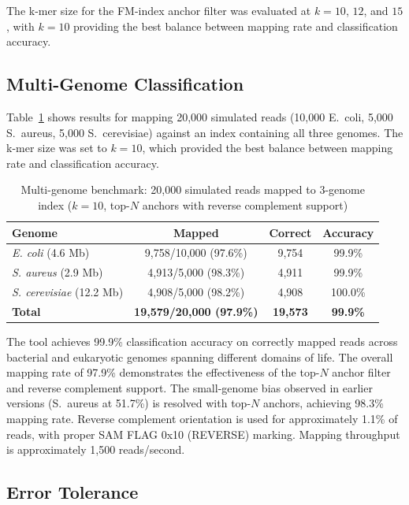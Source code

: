 \documentclass[10pt]{article}
\begin{document}
The k-mer size for the FM-index anchor filter was evaluated at $k = 10$, $12$, and $15$, with $k=10$ providing the best balance between mapping rate and classification accuracy.

\subsection{Multi-Genome Classification}

Table~\ref{tab:multigenome} shows results for mapping 20,000 simulated reads (10,000 E.~coli, 5,000 S.~aureus, 5,000 S.~cerevisiae) against an index containing all three genomes. The k-mer size was set to $k=10$, which provided the best balance between mapping rate and classification accuracy.

\begin{table}[htbp]
\centering
\caption{Multi-genome benchmark: 20,000 simulated reads mapped to 3-genome index ($k=10$, top-$N$ anchors with reverse complement support)}
\label{tab:multigenome}
\begin{tabular}{lccc}
\toprule
\textbf{Genome} & \textbf{Mapped} & \textbf{Correct} & \textbf{Accuracy} \\
\midrule
\textit{E. coli} (4.6 Mb) & 9,758/10,000 (97.6\%) & 9,754 & 99.9\% \\
\textit{S. aureus} (2.9 Mb) & 4,913/5,000 (98.3\%) & 4,911 & 99.9\% \\
\textit{S. cerevisiae} (12.2 Mb) & 4,908/5,000 (98.2\%) & 4,908 & 100.0\% \\
\midrule
\textbf{Total} & \textbf{19,579/20,000 (97.9\%)} & \textbf{19,573} & \textbf{99.9\%} \\
\bottomrule
\end{tabular}
\end{table}

The tool achieves 99.9\% classification accuracy on correctly mapped reads across bacterial and eukaryotic genomes spanning different domains of life. The overall mapping rate of 97.9\% demonstrates the effectiveness of the top-$N$ anchor filter and reverse complement support. The small-genome bias observed in earlier versions (S.~aureus at 51.7\%) is resolved with top-$N$ anchors, achieving 98.3\% mapping rate. Reverse complement orientation is used for approximately 1.1\% of reads, with proper SAM FLAG 0x10 (REVERSE) marking. Mapping throughput is approximately 1,500 reads/second.

\subsection{Error Tolerance}
\end{document}
